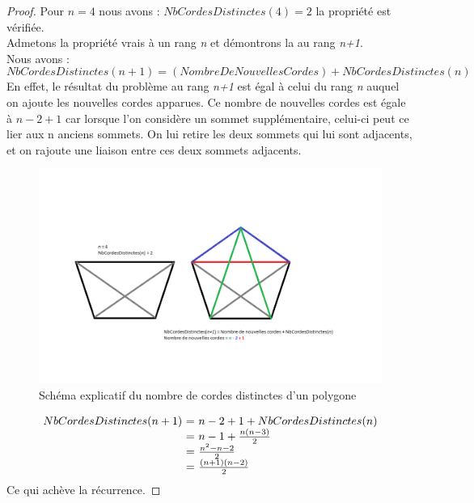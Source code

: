 \documentclass[a4paper,10pt]{article}
\begin{document}
\begin{proof}
Pour \(n = 4\) nous avons : \(NbCordesDistinctes(4)=2 \) la propriété est vérifiée. \\
Admetons la propriété vrais à un rang \emph{n} et démontrons la au rang \emph{n+1}. \\
Nous avons :\\
\[NbCordesDistinctes(n+1) = (NombreDeNouvellesCordes) + NbCordesDistinctes(n)\]
En effet, le résultat du problème au rang \emph{n+1} est égal à celui du rang \emph{n} auquel on ajoute les nouvelles cordes apparues.
Ce nombre de nouvelles cordes est égale à \(n - 2 + 1 \) car lorsque l'on considère un sommet supplémentaire, celui-ci peut ce lier aux n anciens sommets.
On lui retire les deux sommets qui lui sont adjacents, et on rajoute une liaison entre ces deux sommets adjacents.

\begin{figure}[h!]
\begin{center}
\includegraphics[scale=0.5]{dem1.png}
\caption{Schéma explicatif du nombre de cordes distinctes d'un polygone}
\end{center}
\end{figure}

\[
\begin{array}{r @{=} l}
NbCordesDistinctes(n+1) \ & \ n -  2 + 1 + NbCordesDistinctes(n) \\
			  & \ n - 1 + \frac{n(n-3)}{2} \\
			  & \ \frac{{n^2}-n-2}{2} \\
			  & \ \frac{(n+1)(n-2)}{2} \\
\end{array}
\]
Ce qui achève la récurrence.	
\end{proof}
\end{document}
